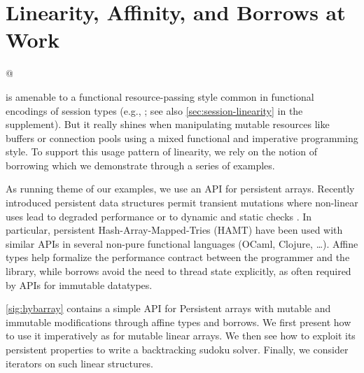 \section{Linearity, Affinity, and Borrows at Work}
\label{motivation}

\lstMakeShortInline[keepspaces,basicstyle=\small\ttfamily]@

\lang{} is amenable to a functional resource-passing style
common in functional encodings of session types (e.g.,
\cite{DBLP:journals/jfp/Padovani17}; see also
\cref{sec:session-linearity} in the supplement). But it really shines
when manipulating mutable resources like buffers or connection pools
using a mixed functional and imperative programming style.
%
To support this usage pattern of linearity, we rely on
the notion of borrowing \cite{DBLP:conf/popl/BoylandR05} which
we demonstrate through a series of examples.

As running theme of our examples, we use an API for persistent arrays.
Recently introduced persistent data structures
permit transient mutations where
non-linear uses lead to degraded performance
\cite{DBLP:conf/ml/ConchonF07} or to
dynamic and static checks \cite{DBLP:journals/pacmpl/Puente17}.
In particular, persistent Hash-Array-Mapped-Tries (HAMT) have been used with similar
APIs in several non-pure functional languages (OCaml, Clojure, \dots).
Affine types help formalize the performance contract between the programmer
and the library, while borrows avoid the need to thread state explicitly,
as often required by APIs for immutable datatypes.

\cref{sig:hybarray} contains a simple API for Persistent arrays
with mutable and immutable modifications through affine types and borrows.
%
We first present how to use it imperatively as for
mutable linear arrays. We then see how to exploit its persistent
properties to write a backtracking sudoku solver. Finally, we consider
iterators on such linear structures.


